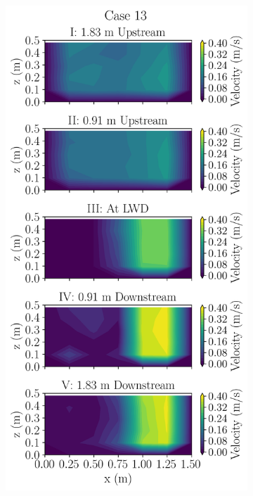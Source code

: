 \documentclass[preview, border=2pt]{standalone}
\begin{document}
\begin{figure}
\begin{subfigure}[b]{0.24\textwidth}
     \end{subfigure}
     \hfill     
     \begin{subfigure}[b]{0.24\textwidth}
         \centering
         \caption{}
         \includegraphics[width=\textwidth]{Case13_velocity_contours.png}
     \end{subfigure}
\end{figure}
\end{document}
